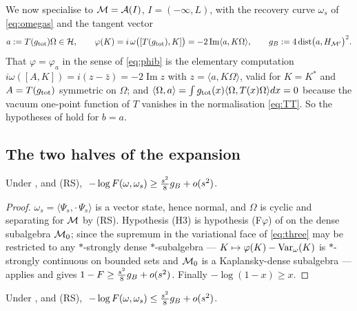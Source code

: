 We now specialise to $\mathcal M=\mathcal A(I)$, $I=(-\infty,L)$, with the recovery curve $\omega_{s}$ of
\eqref{eq:omegas} and the tangent vector
\begin{equation}\label{eq:adef}
 a:=T(g_{\rm tot})\Omega\in\mathcal H,\qquad
 \varphi(K)=i\,\omega\bigl([T(g_{\rm tot}),K]\bigr)=-2\operatorname{Im}\langle a,K\Omega\rangle,
 \qquad g_{B}:=4\operatorname{dist}\bigl(a,H_{\mathcal M'}\bigr)^{2}.
\end{equation}
That $\varphi=\varphi_{a}$ in the sense of \eqref{eq:phib} is the elementary computation
$i\omega([A,K])=i(z-\bar z)=-2\operatorname{Im}z$ with $z=\langle a,K\Omega\rangle$, valid for $K=K^{*}$ and
$A=T(g_{\rm tot})$ symmetric on $\Omega$; and $\langle\Omega,a\rangle=\int g_{\rm tot}(x)
\langle\Omega,T(x)\Omega\rangle dx=0$ because the vacuum one-point function of $T$ vanishes in the
normalisation \eqref{eq:TT}.  So the hypotheses of  hold for $b=a$.

\subsection{The two halves of the expansion}

\begin{proposition}\label{prop:lower}
Under ,  and \textup{(RS)},
$\;-\log F(\omega,\omega_{s})\ge\frac{s^{2}}{8}g_{B}+o(s^{2})$.
\end{proposition}

\begin{proof}
$\omega_{s}=\langle\Psi_{s},\cdot\,\Psi_{s}\rangle$ is a vector state, hence normal, and $\Omega$ is cyclic
and separating for $\mathcal M$ by (RS).  Hypothesis (H3) is hypothesis (F$\varphi$) of  on the
dense subalgebra $\mathcal M_{0}$; since the supremum in the variational face of \eqref{eq:three} may be
restricted to any $*$-strongly dense $*$-subalgebra --- $K\mapsto\varphi(K)-\operatorname{Var}_{\omega}(K)$ is
$*$-strongly continuous on bounded sets and $\mathcal M_{0}$ is a Kaplansky-dense subalgebra --- 
applies and gives $1-F\ge\frac{s^{2}}{8}g_{B}+o(s^{2})$.  Finally $-\log(1-x)\ge x$.
\end{proof}

\begin{proposition}\label{prop:upper}
Under ,  and \textup{(RS)},
$\;-\log F(\omega,\omega_{s})\le\frac{s^{2}}{8}g_{B}+o(s^{2})$.
\end{proposition}

